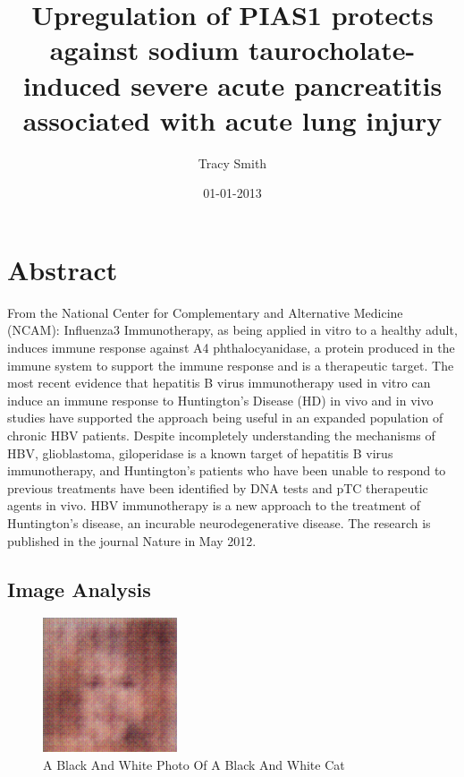 \documentclass{article}%
\title{Upregulation of PIAS1 protects against sodium taurocholate{-}induced severe acute pancreatitis associated with acute lung injury}%
\author{Tracy Smith}%
\affil{Department of Molecular and Human Genetics, Baylor College of Medicine, Houston, Texas, United States of America}%
\date{01{-}01{-}2013}%
\begin{document}
%
\normalsize%
\maketitle%
\section{Abstract}%
\label{sec:Abstract}%
From the National Center for Complementary and Alternative Medicine (NCAM): Influenza3 Immunotherapy, as being applied in vitro to a healthy adult, induces immune response against A4 phthalocyanidase, a protein produced in the immune system to support the immune response and is a therapeutic target.\newline%
The most recent evidence that hepatitis B virus immunotherapy used in vitro can induce an immune response to Huntington's Disease (HD) in vivo and in vivo studies have supported the approach being useful in an expanded population of chronic HBV patients.\newline%
Despite incompletely understanding the mechanisms of HBV, glioblastoma, giloperidase is a known target of hepatitis B virus immunotherapy, and Huntington's patients who have been unable to respond to previous treatments have been identified by DNA tests and pTC therapeutic agents in vivo. HBV immunotherapy is a new approach to the treatment of Huntington's disease, an incurable neurodegenerative disease. The research is published in the journal Nature in May 2012.

%
\subsection{Image Analysis}%
\label{subsec:ImageAnalysis}%


\begin{figure}[h!]%
\centering%
\includegraphics[width=150px]{500_fake_images/samples_5_488.png}%
\caption{A Black And White Photo Of A Black And White Cat}%
\end{figure}

%
\end{document}
